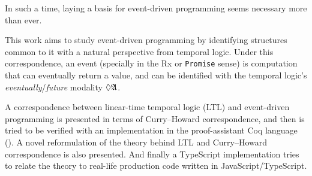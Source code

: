 In such a time, laying a basis for event-driven programming seems necessary more than ever.

This work aims to study event-driven programming by identifying structures common to it with a natural perspective from temporal logic. Under this correspondence, an event (specially in the Rx or \texttt{Promise} sense) is computation that can eventually return a value, and can be identified with the temporal logic's \textit{eventually}/\textit{future} modality $\lozenge\mathfrak{A}$.

A correspondence between linear-time temporal logic (LTL) and event-driven programming is presented in terms of Curry--Howard correspondence, and then is tried to be verified with an implementation in the proof-assistant Coq language (\cite{mohammad_ali_a_rabi_2021_4749276}). A novel reformulation of the theory behind LTL and Curry--Howard correspondence is also presented. And finally a TypeScript implementation tries to relate the theory to real-life production code written in JavaScript/TypeScript.







